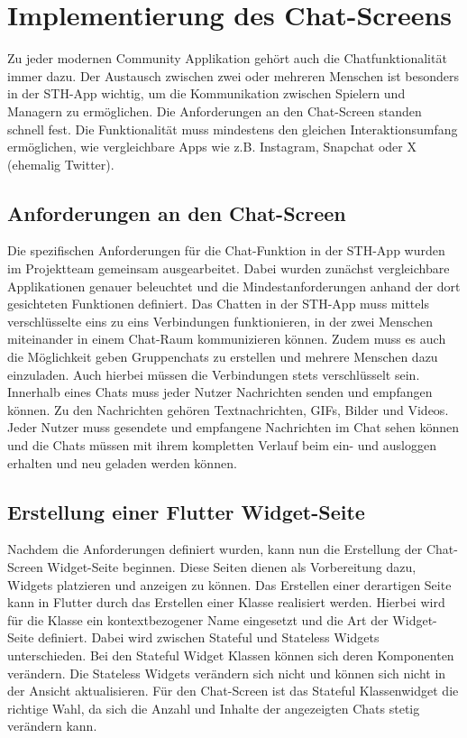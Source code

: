 \chapter{Implementierung des Chat-Screens}
Zu jeder modernen Community Applikation gehört auch die Chatfunktionalität immer dazu. Der Austausch zwischen zwei oder mehreren Menschen ist besonders in der STH-App wichtig, um die Kommunikation zwischen Spielern und Managern zu ermöglichen. Die Anforderungen an den Chat-Screen standen schnell fest. Die Funktionalität muss mindestens den gleichen Interaktionsumfang ermöglichen, wie vergleichbare Apps wie z.B. Instagram, Snapchat oder X (ehemalig Twitter).

\section{Anforderungen an den Chat-Screen}
Die spezifischen Anforderungen für die Chat-Funktion in der STH-App wurden im Projektteam gemeinsam ausgearbeitet. Dabei wurden zunächst vergleichbare Applikationen genauer beleuchtet und die Mindestanforderungen anhand der dort gesichteten Funktionen definiert. Das Chatten in der STH-App muss mittels verschlüsselte eins zu eins Verbindungen funktionieren, in der zwei Menschen miteinander in einem Chat-Raum kommunizieren können. Zudem muss es auch die Möglichkeit geben Gruppenchats zu erstellen und mehrere Menschen dazu einzuladen. Auch hierbei müssen die Verbindungen stets verschlüsselt sein. Innerhalb eines Chats muss jeder Nutzer Nachrichten senden und empfangen können. Zu den Nachrichten gehören Textnachrichten, GIFs, Bilder und Videos. Jeder Nutzer muss gesendete und empfangene Nachrichten im Chat sehen können und die Chats müssen mit ihrem kompletten Verlauf beim ein- und ausloggen erhalten und neu geladen werden können.

\section{Erstellung einer Flutter Widget-Seite}
Nachdem die Anforderungen definiert wurden, kann nun die Erstellung der Chat-Screen Widget-Seite beginnen. Diese Seiten dienen als Vorbereitung dazu, Widgets platzieren und anzeigen zu können. Das Erstellen einer derartigen Seite kann in Flutter durch das Erstellen einer Klasse realisiert werden. Hierbei wird für die Klasse ein kontextbezogener Name eingesetzt und die Art der Widget-Seite definiert. Dabei wird zwischen Stateful und Stateless Widgets unterschieden. Bei den Stateful Widget Klassen können sich deren Komponenten verändern. Die Stateless Widgets verändern sich nicht und können sich nicht in der Ansicht aktualisieren. Für den Chat-Screen ist das Stateful Klassenwidget die richtige Wahl, da sich die Anzahl und Inhalte der angezeigten Chats stetig verändern kann.

